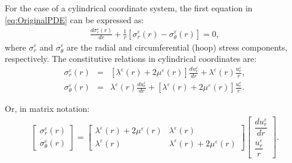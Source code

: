 For the case of a cylindrical coordinate system, the first equation in \eqref{eq:OriginalPDE} can be expressed as:
%
\begin{eqnarray}
    \label{eq:EquilibriumCylindricalForm}
    \frac{d\sigma_{r}^{\varepsilon}(r)}{dr} + \frac{1}{r}\left[\sigma_r^{\varepsilon}(r) - \sigma_\theta^{\varepsilon}(r)\right] = 0,
\end{eqnarray}
%
\noindent where $\sigma_r^{\varepsilon}$ and $\sigma_{\theta}^{\varepsilon}$ are the radial and circumferential (hoop) stress components, respectively. The constitutive relations in cylindrical coordinates are:
%
\begin{eqnarray}\label{eq:HookesLawCylindricalCoords}
    \sigma_{r}^{\varepsilon}(r) &=& \left[ \lambda^{\varepsilon}(r) + 2\mu^{\varepsilon}(r) \right] \frac{d u_{r}^{\varepsilon}}{dr} + \lambda^{\varepsilon}(r) \frac{u_r^{\varepsilon}}{r}, \nonumber\\
    \sigma_{\theta}^{\varepsilon}(r) &=& \lambda^{\varepsilon}(r) \frac{d u_{r}^{\varepsilon}}{dr} + \left[ \lambda^{\varepsilon}(r) + 2\mu^{\varepsilon}(r) \right] \frac{u_r^{\varepsilon}}{r}.
\end{eqnarray}

Or, in matrix notation:
%
\begin{equation}
    \begin{aligned}
        \begin{bmatrix}
            \sigma_{r}^{\varepsilon}(r)\\
            \sigma_{\theta}^{\varepsilon}(r)
        \end{bmatrix} =
        \begin{bmatrix}
            \lambda^{\varepsilon}(r) + 2\mu^{\varepsilon}(r) &  \lambda^{\varepsilon}(r)\\
            \lambda^{\varepsilon}(r) & \lambda^{\varepsilon}(r) + 2\mu^{\varepsilon}(r)
        \end{bmatrix}
        \begin{bmatrix}
            \dfrac{du_r^{\varepsilon}}{dr}\\
            \dfrac{u_r^{\varepsilon}}{r}
        \end{bmatrix}.
    \end{aligned}
\end{equation}

\def\Sigmari{\sigma_{r}^{\varepsilon}(r_i) =  C^{\varepsilon}_{11}(r_i)\frac{d u_{r}}{d r} + C^{\varepsilon}_{12}(r_i)\frac{u_r}{r_i}}
\def\Sigmare{\sigma_{r}^{\varepsilon}(r_e) =  C^{\varepsilon}_{11}(r_e)\frac{d u_{r}}{d r} + C^{\varepsilon}_{12}(r_e)\frac{u_r}{r_e}}


